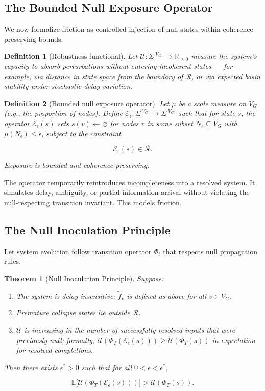 \documentclass[11pt]{article}
\newtheorem{theorem}{Theorem}
\newtheorem{definition}{Definition}
\theoremstyle{remark}
\begin{document}
\subsection{The Bounded Null Exposure Operator}

We now formalize friction as controlled injection of null states within coherence-preserving bounds.

\begin{definition}[Robustness functional]
Let $\mathcal{U} : \Sigma^{|V_G|} \to \mathbb{R}_{\geq 0}$ measure the system's capacity to absorb perturbations without entering incoherent states --- for example, via distance in state space from the boundary of $\mathcal{R}$, or via expected basin stability under stochastic delay variation.
\end{definition}

\begin{definition}[Bounded null exposure operator]
Let $\mu$ be a scale measure on $V_G$ (e.g., the proportion of nodes). Define $\mathcal{E}_\epsilon : \Sigma^{|V_G|} \to \Sigma^{|V_G|}$ such that for state $s$, the operator $\mathcal{E}_\epsilon(s)$ sets $s(v) \leftarrow \varnothing$ for nodes $v$ in some subset $N_\epsilon \subseteq V_G$ with $\mu(N_\epsilon) \leq \epsilon$, subject to the constraint

\[
\mathcal{E}_\epsilon(s) \in \mathcal{R}.
\]

Exposure is bounded and coherence-preserving.
\end{definition}

The operator temporarily reintroduces incompleteness into a resolved system. It simulates delay, ambiguity, or partial information arrival without violating the null-respecting transition invariant. This models friction.

\subsection{The Null Inoculation Principle}

Let system evolution follow transition operator $\Phi_t$ that respects null propagation rules.

\begin{theorem}[Null Inoculation Principle]
\label{thm:nip}
Suppose:
\begin{enumerate}[label=(\roman*)]
  \item The system is delay-insensitive: $\tilde{f}_v$ is defined as above for all $v \in V_G$.
  \item Premature collapse states lie outside $\mathcal{R}$.
  \item $\mathcal{U}$ is increasing in the number of successfully resolved inputs that were previously null; formally, $\mathcal{U}(\Phi_T(\mathcal{E}_\epsilon(s))) \geq \mathcal{U}(\Phi_T(s))$ in expectation for resolved completions.
\end{enumerate}
Then there exists $\epsilon^* > 0$ such that for all $0 < \epsilon < \epsilon^*$,

\[
\mathbb{E}\bigl[\mathcal{U}(\Phi_T(\mathcal{E}_\epsilon(s)))\bigr] > \mathcal{U}(\Phi_T(s)).
\]
\end{theorem}
\end{document}
